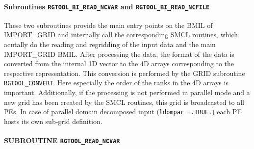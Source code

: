 \documentclass[11pt,twoside]{report}
\begin{document}
\paragraph{Subroutines {\color{blue} \tt\bf RGTOOL\_BI\_READ\_NCVAR} and
{\color{blue} \tt\bf RGTOOL\_BI\_READ\_NCFILE}\\}
These two subroutines provide the main entry points on the BMIL of
IMPORT\_GRID and internally call the corresponding SMCL routines, which
acutally do the reading and regridding of the input data and the main 
IMPORT\_GRID BMIL. After processing the data, the format of  the
data is converted from the internal 1D vector to the 4D arrays 
corresponding to the respective representation. This
conversion is performed by the GRID subroutine \verb|RGTOOL_CONVERT|. 
Here especially the order of the ranks in the
4D arrays is important. Additionally, if the processing is not
performed in parallel mode and a new grid has been created by the 
SMCL routines, this grid is broadcasted to all PEs.
 In case of parallel domain decomposed input 
(\verb|ldompar =.TRUE.|) each PE hosts its own sub-grid definition.
 
\paragraph{SUBROUTINE \color{blue} \tt\bf RGTOOL\_READ\_NCVAR\\ \label{RGREADNCVAR}}
\end{document}
